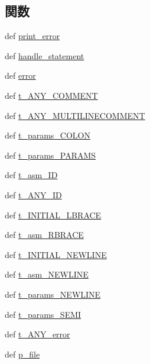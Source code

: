 \subsection*{関数}
\begin{DoxyCompactItemize}
\item 
def \hyperlink{namespacemicro__asm_a96434e74020a56392cf780137ed37e97}{print\_\-error}
\item 
def \hyperlink{namespacemicro__asm_a1eb3d34a205235b95d352afbdc605c4d}{handle\_\-statement}
\item 
def \hyperlink{namespacemicro__asm_aac1c7ff3716ce006fcaf70d6764ce105}{error}
\item 
def \hyperlink{namespacemicro__asm_aebcbdea8d15279a91facd2b15955adee}{t\_\-ANY\_\-COMMENT}
\item 
def \hyperlink{namespacemicro__asm_a8f356658252996771cbfeff5f1e22598}{t\_\-ANY\_\-MULTILINECOMMENT}
\item 
def \hyperlink{namespacemicro__asm_a3848d5690974e3ec07f038ea017bf8bc}{t\_\-params\_\-COLON}
\item 
def \hyperlink{namespacemicro__asm_a95021a4fe487544ac75a27dd642332bc}{t\_\-params\_\-PARAMS}
\item 
def \hyperlink{namespacemicro__asm_a5392547f3aa663a26f335c12f5e1d90a}{t\_\-asm\_\-ID}
\item 
def \hyperlink{namespacemicro__asm_a8bd1b1ba139acf81145c33e6585aae5d}{t\_\-ANY\_\-ID}
\item 
def \hyperlink{namespacemicro__asm_aa2c06c393c224afce043356650406e53}{t\_\-INITIAL\_\-LBRACE}
\item 
def \hyperlink{namespacemicro__asm_a76fb1d4218c5b61b6da97a71c50cf2a6}{t\_\-asm\_\-RBRACE}
\item 
def \hyperlink{namespacemicro__asm_a01568e4c45abbf86a0d13ed07b788a73}{t\_\-INITIAL\_\-NEWLINE}
\item 
def \hyperlink{namespacemicro__asm_adc4f9c72cba5be242bb93df6c49c3bc5}{t\_\-asm\_\-NEWLINE}
\item 
def \hyperlink{namespacemicro__asm_a466b4ac51d5f9226e723240cdb1b809d}{t\_\-params\_\-NEWLINE}
\item 
def \hyperlink{namespacemicro__asm_a771bc622a40e7ad0bccc1715a303dff0}{t\_\-params\_\-SEMI}
\item 
def \hyperlink{namespacemicro__asm_a8a27a0ed21dc2158cf69643547032d6c}{t\_\-ANY\_\-error}
\item 
def \hyperlink{namespacemicro__asm_a61564c360e71827a5ab5edf7e138e4c1}{p\_\-file}
\item 

\end{DoxyCompactItemize}
